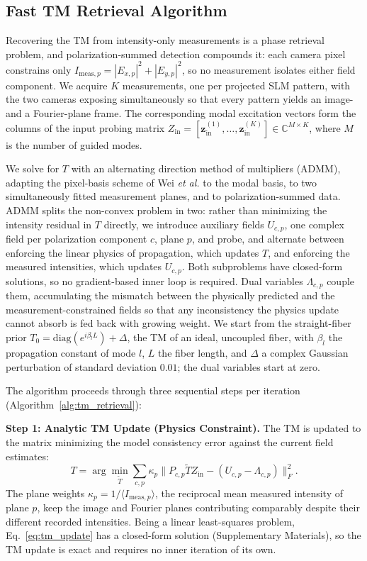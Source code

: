 \documentclass{article}
\begin{document}
\subsection{Fast TM Retrieval Algorithm}
Recovering the TM from intensity-only measurements is a phase retrieval problem, and polarization-summed detection compounds it: each camera pixel constrains only $I_{\text{meas},p} = |E_{x,p}|^2 + |E_{y,p}|^2$, so no measurement isolates either field component.
We acquire $K$ measurements, one per projected SLM pattern, with the two cameras exposing simultaneously so that every pattern yields an image- and a Fourier-plane frame.
The corresponding modal excitation vectors form the columns of the input probing matrix $Z_{\text{in}} = [\mathbf{z}_{\text{in}}^{(1)}, \dots, \mathbf{z}_{\text{in}}^{(K)}] \in \mathbb{C}^{M \times K}$, where $M$ is the number of guided modes.

We solve for $T$ with an alternating direction method of multipliers (ADMM), adapting the pixel-basis scheme of Wei \textit{et al.} \cite{wei2026millisecond} to the modal basis, to two simultaneously fitted measurement planes, and to polarization-summed data.
ADMM splits the non-convex problem in two: rather than minimizing the intensity residual in $T$ directly, we introduce auxiliary fields $U_{c,p}$, one complex field per polarization component $c$, plane $p$, and probe, and alternate between enforcing the linear physics of propagation, which updates $T$, and enforcing the measured intensities, which updates $U_{c,p}$.
Both subproblems have closed-form solutions, so no gradient-based inner loop is required.
Dual variables $\Lambda_{c,p}$ couple them, accumulating the mismatch between the physically predicted and the measurement-constrained fields so that any inconsistency the physics update cannot absorb is fed back with growing weight.
We start from the straight-fiber prior $T_0 = \mathrm{diag}(e^{i\beta_l L}) + \Delta$, the TM of an ideal, uncoupled fiber, with $\beta_l$ the propagation constant of mode $l$, $L$ the fiber length, and $\Delta$ a complex Gaussian perturbation of standard deviation $0.01$; the dual variables start at zero.

The algorithm proceeds through three sequential steps per iteration (Algorithm~\ref{alg:tm_retrieval}):

\textbf{Step 1: Analytic TM Update (Physics Constraint).}
The TM is updated to the matrix minimizing the model consistency error against the current field estimates:
\begin{equation}
\label{eq:tm_update}
T = \arg\min_{\tilde{T}} \sum_{c,p} \kappa_p \| P_{c,p} \tilde{T} Z_{\text{in}} - (U_{c,p} - \Lambda_{c,p}) \|_F^2.
\end{equation}
The plane weights $\kappa_p = 1/\langle I_{\text{meas},p} \rangle$, the reciprocal mean measured intensity of plane $p$, keep the image and Fourier planes contributing comparably despite their different recorded intensities.
Being a linear least-squares problem, Eq.~\eqref{eq:tm_update} has a closed-form solution (Supplementary Materials), so the TM update is exact and requires no inner iteration of its own.
\end{document}
